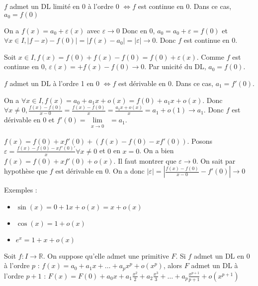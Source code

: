 \documentclass[french]{yLectureNote}
\newcommand{\Lim}[1]{\lim\limits_{\substack{#1}}\:}
\newcommand{\R}[0]{\mathbb{R}}
\begin{document}
\begin{lemma}
\(f\) admet un DL limité en 0 à l'ordre 0 \(\iff f\) est continue en 0. Dans ce cas, \(a_0 = f(0)\)
\end{lemma}
\begin{myproof}
On a $f(x) = a_0 + \varepsilon(x)$ avec $\varepsilon \to 0$ Donc en 0, $a_0 = a_0+\varepsilon = f(0)$ et $\forall x\in I, |f-x)-f(0)| = |f(x)-a_0| = |\varepsilon|\to 0$. Donc $f$ est continue en 0.

Soit $x\in I, f(x) = f(0) + f(x) - f(0) = f(0) + \varepsilon(x)$. Comme $f$ est continue en 0, $\varepsilon(x) = + f(x) - f(0) \to 0$. Par unicité du DL, $a_0 = f(0)$.
\end{myproof}
\begin{lemma}
\(f\) admet un DL à l'ordre 1 en 0 \(\iff f\) est dérivable en 0. Dans ce cas, \(a_1 = f'(0)\).
\end{lemma}
\begin{myproof}
On a $\forall x\in I,f(x) = a_0+a_1x+o(x) = f(0)+a_1x+o(x)$. Donc $\forall x\neq 0, \frac{f(x)-f(0)}{x-0} =  \frac{f(x)-f(0)}{x} =  \frac{a_1x+o(x)}{x} = a_1+o(1) \to a_1$. Donc $f$ est dérivable en 0 et $f'(0) = \Lim{x\to0} = a_1$.

$f(x) = f(0) + xf'(0) + (f(x)-f(0)-xf'(0))$. Posons $\varepsilon = \frac{f(x)-f(0)-xf'(0)'}{x}\forall x\neq 0$ et $0$ en $x=0$. On a bien $f(x) = f(0)+xf'(0)+o(x)$. Il faut montrer que $\varepsilon \to 0$. On sait par hypothèse que $f$ est dérivable en 0. On a donc $|\varepsilon| = |\frac{f(x)-f(0)}{x-0} - f'(0)| \to 0$
\end{myproof}
Exemples :\begin{itemize}
           \item  \(\sin(x) = 0 + 1x + o(x) = x+o(x)\)
           \item \(\cos(x) = 1+o(x)\)
           \item \(e^x = 1+x+o(x)\)
          \end{itemize}
\begin{proposition}[DL et ``primitivation'']
Soit \(f : I\to \R\). On suppose qu'elle admet une primitive \(F\). Si \(f\) admet un DL en 0 à l'ordre \(p\) : \(f(x) = a_0+a_1x+\dots+a_px^p+o(x^p)\), alors \(F\) admet un DL à l'ordre \(p+1\) : \(F(x) = F(0) + a_0x+a_1\frac{x^2}{2}+a_2\frac{x^3}{3}+\dots+a_p\frac{x^{p+1}}{p+1}+o(x^{p+1})\)
\end{proposition}
\end{document}
